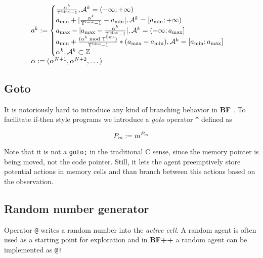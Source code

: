 \begin{equation}
\label{eq:act}
\begin{array}{l}
    a^k := \begin{cases}
\frac{\alpha^k}{\Upsilon^\text{bins}-1}, \mathcal{A}^k = (- \infty; + \infty) \\
a_{\text{min}} + |\frac{\alpha^k}{\Upsilon^\text{bins}-1} - a_{\text{min}}|, \mathcal{A}^k = [a_{\text{min}}; + \infty) \\
a_{\text{max}} - |a_{\text{max}} - \frac{\alpha^k}{\Upsilon^\text{bins}-1}|, \mathcal{A}^k = (- \infty; a_{\text{max}}] \\
a_{\text{min}} + \frac{(\alpha^k \bmod \Upsilon^\text{bins})}{\Upsilon^\text{bins} - 1} * (a_{\text{max}} - a_{\text{min}}), \mathcal{A}^k = [a_{\text{min}}; a_{\text{max}}] \\
\alpha^k, \mathcal{A}^k \subset \mathbb{Z}
\end{cases} \\
    \alpha := (\alpha^{N+1}, \alpha^{N+2}, \dots)
\end{array}
\end{equation}

\subsection{Goto}
\label{sec:goto}

It is notoriously hard to introduce any kind of branching behavior in \textbf{BF} \cite{linanderControlFlowBrainfuck2016}.
To facilitate if-then style programs we introduce a \textit{goto} operator \verb|^| defined as 

\begin{equation}
   P_m := m^{P_m} 
\end{equation}

Note that it is not a \texttt{goto;} in the traditional C sense, since the memory pointer is being moved, not the code pointer.
Still, it lets the agent preemptively store potential actions in memory cells and than branch between this actions based on the observation.

\subsection{Random number generator}
\label{sec:random}

Operator \texttt{@} writes a random number into the \textit{active cell}.
A random agent is often used as a starting point for exploration and in \textbf{BF++} a random agent can be implemented as \verb|@!|

